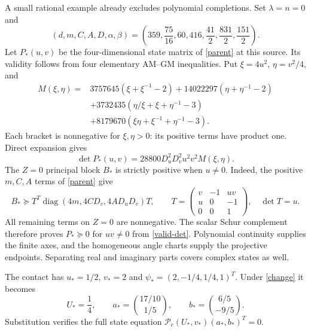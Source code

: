 \documentclass[11pt]{article}
\begin{document}
A small rational example already excludes polynomial completions. Set
$\lambda=n=0$ and
\[
 (d,m,C,A,D,\alpha,\beta)
 =\left(359,\frac{75}{16},60,416,\frac{41}{2},
                       \frac{831}{2},\frac{151}{2}\right).
\]
Let $P_*(u,v)$ be the four-dimensional state matrix of \eqref{parent}
at this source. Its validity follows from four elementary AM--GM
inequalities. Put $\xi=4u^2$, $\eta=v^2/4$, and
\begin{align*}
 M(\xi,\eta)={}&3757645(\xi+\xi^{-1}-2)
       +14022297(\eta+\eta^{-1}-2)\\
 &+3732435(\eta/\xi+\xi+\eta^{-1}-3)\\
 &+8179670(\xi\eta+\xi^{-1}+\eta^{-1}-3).
\end{align*}
Each bracket is nonnegative for $\xi,\eta>0$: its positive terms have
product one. Direct expansion gives
\begin{equation}
 \det P_*(u,v)=28800D_u^2D_v^2u^2v^2M(\xi,\eta).
 \label{valid-det}
\end{equation}
The $Z=0$ principal block $B_*$ is strictly positive when $u\ne0$.
Indeed, the positive $m,C,A$ terms of \eqref{parent} give
\[
 B_*\succeq T^T\operatorname{diag}(4m,4CD_v,4AD_uD_v)T,
 \qquad
 T=\begin{pmatrix}v&-1&uv\\u&0&-1\\0&0&1\end{pmatrix},
 \quad \det T=u.
\]
All remaining terms on $Z=0$ are nonnegative. The scalar Schur complement
therefore proves $P_*\succeq0$ for $uv\ne0$ from \eqref{valid-det}.
Polynomial continuity supplies the finite axes, and the homogeneous
angle charts supply the projective endpoints. Separating real and imaginary
parts covers complex states as well.

The contact has $u_*=1/2$, $v_*=2$ and
$\psi_*=(2,-1/4,1/4,1)^T$. Under \eqref{change} it becomes
\begin{equation}
 U_*=\frac14,\qquad
 a_*=\binom{17/10}{1/5},\qquad
 b_*=\binom{6/5}{-9/5}.
 \label{contact}
\end{equation}
Substitution verifies the full state equation
$\mathcal P_c(U_*,v_*)(a_*,b_*)^T=0$.
\end{document}
